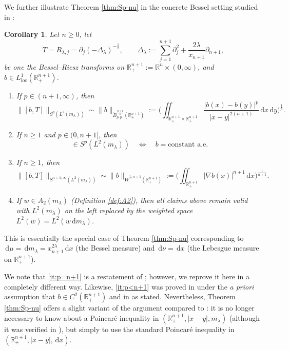 \documentclass[reqno]{amsart}
\newcommand{\ud}[0]{\,\mathrm{d}}
\newcommand{\abs}[1]{|#1|}
\newcommand{\Norm}[2]{\|#1\|_{#2}}
\newcommand{\loc}[0]{\operatorname{loc}}
\newcommand{\R}{\mathbb{R}}
\theoremstyle{plain}
\newtheorem{corollary}[equation]{Corollary}
\theoremstyle{definition}
\theoremstyle{remark}
\begin{document}
We further illustrate Theorem \ref{thm:Sp-nu} in the concrete Bessel setting studied in \cite{FLLX,FLSZ}:

\begin{corollary}\label{cor:Bessel}
Let $n\geq 0$, let
\begin{equation*}
   T=R_{\lambda,j}=\partial_j(-\Delta_\lambda)^{-\frac12},\qquad
   \Delta_\lambda:=\sum_{j=1}^{n+1}\partial_j^2+\frac{2\lambda}{x_{n+1}}\partial_{n+1},
\end{equation*}
be one the Bessel--Riesz transforms on $\R_+^{n+1}:=\R^n\times(0,\infty)$, and $b\in L^1_{\loc}(\R^{n+1}_+)$.
\begin{enumerate}[\rm(1)]
  \item\label{it:p>n+1} If $p\in(n+1,\infty)$, then 
\begin{equation*}
  \Norm{[b,T]}{S^p(L^2(m_\lambda))}
  \sim \Norm{b}{\dot B^{\frac{n+1}{p}}_{p,p}(\R^{n+1}_+)} 
  :=\Big(\iint_{\R^{n+1}_+\times\R^{n+1}_+}\frac{\abs{b(x)-b(y)}^p}{\abs{x-y}^{2(n+1)}}\ud x\ud y\Big)^{\frac1p}.
\end{equation*}

  \item\label{it:p<n+1}  If $n\geq 1$ and $p\in(0,n+1]$, then
\begin{equation*}
     [b,T]\in S^p(L^2(m_\lambda))\quad\Leftrightarrow\quad
     b=\text{constant a.e.}
\end{equation*}


  \item\label{it:p=n+1} If $n\geq 1$, then 
\begin{equation}\label{eq:p=n+1}
  \Norm{[b,T]}{S^{n+1,\infty}(L^2(m_\lambda))}
  \sim \Norm{b}{\dot W^{1,n+1}(\R^{n+1}_+)} 
  :=\Big(\iint_{\R^{n+1}_+}\abs{\nabla b(x)}^{n+1}\ud x\Big)^{\frac{1}{n+1}}.
\end{equation}

  \item\label{it:Bessel-A2} If $w\in A_2(m_\lambda)$ (Definition \ref{def:A2}), then all claims above remain valid with $L^2(m_\lambda)$ on the left replaced by the weighted space $L^2(w)=L^2(w\ud m_\lambda)$.
\end{enumerate}
\end{corollary}

This is essentially the special case of Theorem \ref{thm:Sp-nu} corresponding to $\ud\mu=\ud m_\lambda=x_{n+1}^{2\lambda}\ud x$ (the Bessel measure) and $\ud\nu=\ud x$ (the Lebesgue measure on $\R_+^{n+1}$).

We note that \eqref{it:p=n+1} is a restatement of \cite[Theorem 1.2]{FLSZ}; however, we reprove it here in a completely different way. Likewise, \eqref{it:p<n+1} was proved in \cite[Theorem 1.5]{FLLX} under the {\em a priori} assumption that $b\in C^2(\R_+^{n+1})$ and in \cite[Example 1.23]{Hyt:Sp} as stated. Nevertheless, Theorem \ref{thm:Sp-nu} offers a slight variant of the argument compared to \cite{Hyt:Sp}: it is no longer necessary to know about a Poincar\'e inequality in $(\R_+^{n+1},\abs{x-y},m_\lambda)$ (although it was verified in \cite[Proposition 4.2]{Hyt:Sp}), but simply to use the standard Poincar\'e inequality in $(\R_+^{n+1},\abs{x-y},\ud x)$.
\end{document}
